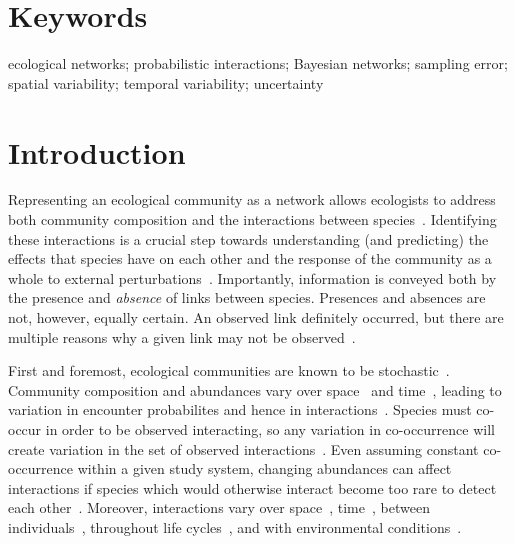 \documentclass[12pt]{article}
\begin{document}
\begin{spacing}{2.0}
\section*{\small Keywords}

ecological networks; probabilistic interactions; Bayesian networks; sampling error; spatial variability; temporal variability; uncertainty

\linenumbers
\clearpage

\section*{Introduction}

    Representing an ecological community as a network allows ecologists to address both community composition and the interactions between species~\citep{Roslin2016}. Identifying these interactions is a crucial step towards understanding (and predicting) the effects that species have on each other and the response of the community as a whole to external perturbations~\citep{Bartomeus2016,Giron2018}. Importantly, information is conveyed both by the presence and \emph{absence} of links between species. Presences and absences are not, however, equally certain. An observed link definitely occurred, but there are multiple reasons why a given link may not be observed~\citep{Jordano2016}. 


    First and foremost, ecological communities are known to be stochastic~\citep{Gotelli2000}. Community composition and abundances vary over space~\citep{Baiser2012} and time~\citep{Olesen2011a}, leading to variation in encounter probabilites and hence in interactions~\citep{Vazquez2005,Poisot2015,Graham2018}. Species must co-occur in order to be observed interacting, so any variation in co-occurrence will create variation in the set of observed interactions~\citep{Gravel2013,Graham2018}. Even assuming constant co-occurrence within a given study system, changing abundances can affect interactions if species which would otherwise interact become too rare to detect each other~\citep{Tylianakis2010,Jordano2016}. Moreover, interactions vary over space~\citep{Kitching1987,Baiser2012,Emer2018}, time~\citep{Kitching1987,Olesen2011a,Lopez2017}, between individuals~\citep{Pires2011a,Fodrie2015,Novak2015}, throughout life cycles~\citep{Preston2014,Clegg2018}, and with environmental conditions~\citep{Poisot2015}.



\end{spacing}
\end{document}

